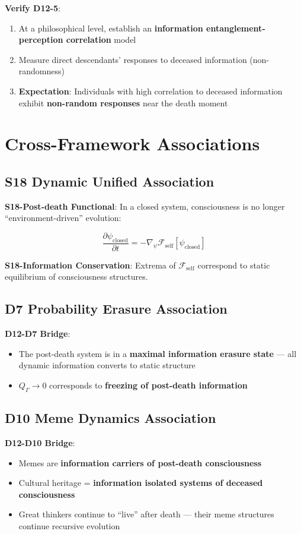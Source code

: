 \documentclass[12pt,a4paper]{article}
\newcommand{\Fself}{\mathcal{F}_{\text{self}}}
\begin{document}
\textbf{Verify D12-5}:
\begin{enumerate}
    \item At a philosophical level, establish an \textbf{information entanglement-perception correlation} model
    \item Measure direct descendants' responses to deceased information (non-randomness)
    \item \textbf{Expectation}: Individuals with high correlation to deceased information exhibit \textbf{non-random responses} near the death moment
\end{enumerate}

\section{Cross-Framework Associations}

\subsection{S18 Dynamic Unified Association}

\textbf{S18-Post-death Functional}: In a closed system, consciousness is no longer ``environment-driven'' evolution:

$$\frac{\partial \psi_{\text{closed}}}{\partial t} = -\nabla_{\psi} \Fself[\psi_{\text{closed}}]$$

\textbf{S18-Information Conservation}: Extrema of $\Fself$ correspond to static equilibrium of consciousness structures.

\subsection{D7 Probability Erasure Association}

\textbf{D12-D7 Bridge}:
\begin{itemize}
    \item The post-death system is in a \textbf{maximal information erasure state} --- all dynamic information converts to static structure
    \item $Q_{\Gamma} \to 0$ corresponds to \textbf{freezing of post-death information}
\end{itemize}

\subsection{D10 Meme Dynamics Association}

\textbf{D12-D10 Bridge}:
\begin{itemize}
    \item Memes are \textbf{information carriers of post-death consciousness}
    \item Cultural heritage = \textbf{information isolated systems of deceased consciousness}
    \item Great thinkers continue to ``live'' after death --- their meme structures continue recursive evolution
\end{itemize}
\end{document}
